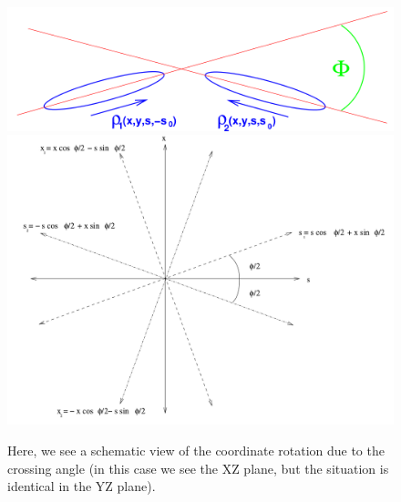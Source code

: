 \begin{figure}
\begin{center}
\includegraphics[width=\linewidth,height=0.5\textheight,keepaspectratio]{../HourglassCorrection/figs/xing_bunch}
\includegraphics[width=\linewidth,height=0.5\textheight,keepaspectratio]{../HourglassCorrection/figs/bunch_rotation}
\caption{ 
Here, we see a schematic view of the coordinate rotation due to the crossing
angle (in this case we see the XZ plane, but the situation is identical in the
YZ plane).
}
\label{fig:xz_angle}
\end{center}
\end{figure}
